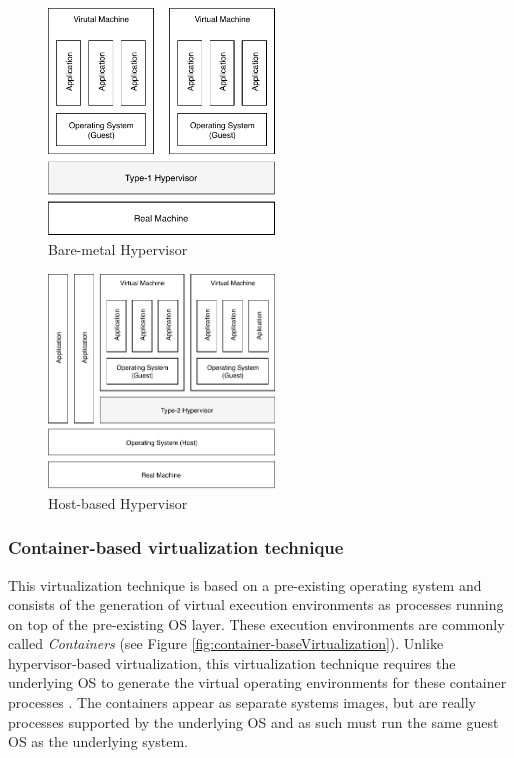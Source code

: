 	\begin{figure}[H]
		\centering
		\includegraphics[width=6cm]{images/bare-metalHypervisor.pdf}
		\vspace{-0.2cm}
		\caption{Bare-metal Hypervisor}
		\label{fig:Bare-metalHypervisor}
	\end{figure}
	
	\begin{figure}[H]
		\centering
		\includegraphics[width=6cm]{images/hosted-BasedHypervisor.pdf}
		\vspace{-0.2cm}
		\caption{Host-based Hypervisor}
		\label{fig:host-basedHypervisor}
	\end{figure}
	
	\subsubsection {Container-based virtualization technique}
	
	This virtualization technique is based on a pre-existing operating system and consists of the generation of virtual execution environments as processes running on top of the pre-existing OS layer. 
	These execution environments are commonly called \textit{Containers} (see Figure \ref{fig:container-baseVirtualization}). Unlike hypervisor-based virtualization, this virtualization technique requires  the underlying OS to generate the virtual operating environments for these container processes \cite{Kon2017}. The containers appear as separate systems images, but are really processes supported by the underlying OS and as such must run the same guest OS as the underlying system.
	
